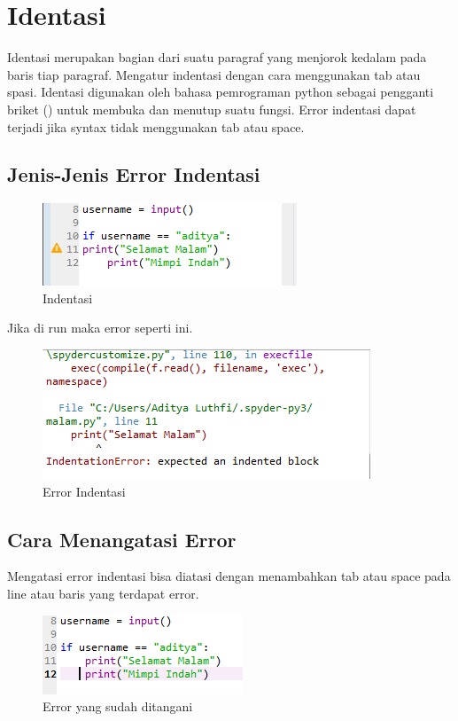 \documentclass[12pt, times new roman, a4paper]{article}
\begin{document}
\section{Identasi}
Identasi merupakan bagian dari suatu paragraf yang menjorok kedalam pada baris tiap paragraf. Mengatur indentasi dengan cara menggunakan tab atau spasi. Identasi digunakan oleh bahasa pemrograman python sebagai pengganti briket ({}) untuk membuka dan menutup suatu fungsi. Error indentasi dapat terjadi jika syntax tidak menggunakan tab atau space.

\subsection{Jenis-Jenis Error Indentasi}
	\begin{figure}[h]
		\centering
		\includegraphics[scale=0.7]{Gambar/a}
		\caption{Indentasi}
	\end{figure}
Jika di run maka error seperti ini. 
	\begin{figure}[h]
		\centering
		\includegraphics[scale=0.9]{Gambar/b}
		\caption{Error Indentasi}
	\end{figure}

\subsection{Cara Menangatasi Error}
Mengatasi error indentasi bisa diatasi dengan menambahkan tab atau space pada line atau baris yang terdapat error.

\begin{figure}[h]
		\centering
		\includegraphics[scale=1]{Gambar/c}
		\caption{Error yang sudah ditangani}
	\end{figure}
\end{document}
